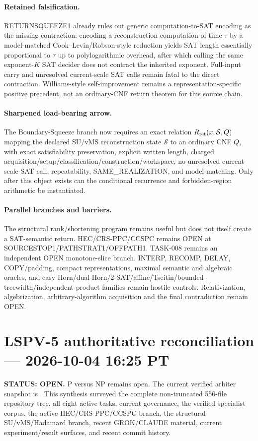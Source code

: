 \documentclass[11pt]{article}
\begin{document}
\paragraph{Retained falsification.}
RETURNSQUEEZE1 already rules out generic computation-to-SAT encoding as the missing contraction: encoding a reconstruction computation of time $\tau$ by a model-matched Cook--Levin/Robson-style reduction yields SAT length essentially proportional to $\tau$ up to polylogarithmic overhead, after which calling the same exponent-$K$ SAT decider does not contract the inherited exponent. Full-input carry and unresolved current-scale SAT calls remain fatal to the direct contraction. Williams-style self-improvement remains a representation-specific positive precedent, not an ordinary-CNF return theorem for this source chain.

\paragraph{Sharpened load-bearing arrow.}
The Boundary-Squeeze branch now requires an exact relation $R_{\rm ret}(x,\mathcal S,Q)$ mapping the declared SU/vMS reconstruction state $\mathcal S$ to an ordinary CNF $Q$, with exact satisfiability preservation, explicit written length, charged acquisition/setup/classification/construction/workspace, no unresolved current-scale SAT call, repeatability, SAME\_REALIZATION, and model matching. Only after this object exists can the conditional recurrence and forbidden-region arithmetic be instantiated.

\paragraph{Parallel branches and barriers.}
The structural rank/shortening program remains useful but does not itself create a SAT-semantic return. HEC/CRS-PPC/CCSPC remains OPEN at SOURCESTOP1/PATHSTRAT1/OFFPATH1. TASK-008 remains an independent OPEN monotone-slice branch. INTERP, RECOMP, DELAY, COPY/padding, compact representations, maximal semantic and algebraic oracles, and easy Horn/dual-Horn/2-SAT/affine/Tseitin/bounded-treewidth/independent-product families remain hostile controls. Relativization, algebrization, arbitrary-algorithm acquisition and the final contradiction remain OPEN.




\section{LSPV-5 authoritative reconciliation --- 2026-10-04 16:25 PT}
\textbf{STATUS: OPEN.} P versus NP remains open. The current verified arbiter snapshot is
. This synthesis surveyed the
complete non-truncated 556-file repository tree, all eight active tasks, current governance,
the verified specialist corpus, the active HEC/CRS-PPC/CCSPC branch, the structural
SU/vMS/Hadamard branch, recent GROK/CLAUDE material, current experiment/result surfaces,
and recent commit history.
\end{document}
